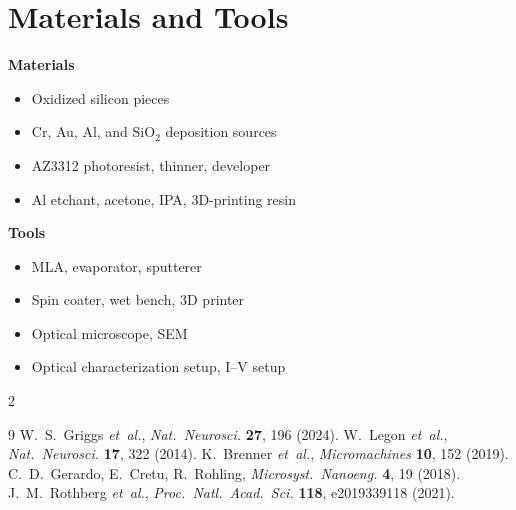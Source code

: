\documentclass[9pt]{extarticle}
\begin{document}
\section{Materials and Tools}

\begin{minipage}[t]{0.48\textwidth}
  \textbf{Materials}
  \begin{itemize}
    \item Oxidized silicon pieces
    \item Cr, Au, Al, and SiO$_2$ deposition sources
    \item AZ3312 photoresist, thinner, developer
    \item Al etchant, acetone, IPA, 3D-printing resin
  \end{itemize}
\end{minipage}\hfill
\begin{minipage}[t]{0.48\textwidth}
  \textbf{Tools}
  \begin{itemize}
    \item MLA, evaporator, sputterer
    \item Spin coater, wet bench, 3D printer
    \item Optical microscope, SEM
    \item Optical characterization setup, I--V setup
  \end{itemize}
\end{minipage}

\begingroup
\footnotesize
\renewcommand{\section}[2]{\vspace{4.5pt}\noindent{\normalsize\bfseries\scshape References}\par\vspace{0.5pt}}
\begin{multicols}{2}
\begin{thebibliography}{9}\setlength{\itemsep}{0.5pt}
   W.~S.~Griggs \emph{et~al.}, \emph{Nat.\ Neurosci.} \textbf{27}, 196 (2024).
   W.~Legon \emph{et~al.}, \emph{Nat.\ Neurosci.} \textbf{17}, 322 (2014).
   K.~Brenner \emph{et~al.}, \emph{Micromachines} \textbf{10}, 152 (2019).
   C.~D.~Gerardo, E.~Cretu, R.~Rohling, \emph{Microsyst.\ Nanoeng.} \textbf{4}, 19 (2018).
   J.~M.~Rothberg \emph{et~al.}, \emph{Proc.\ Natl.\ Acad.\ Sci.} \textbf{118}, e2019339118 (2021).
\end{thebibliography}
\end{multicols}
\endgroup
\end{document}
